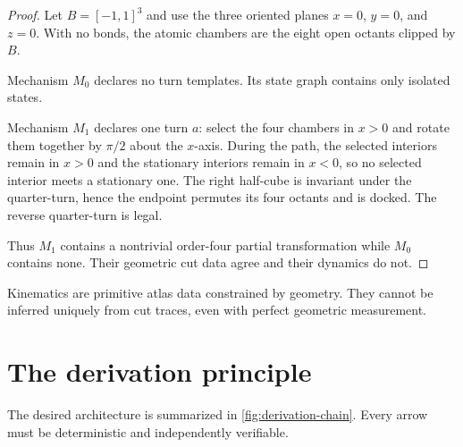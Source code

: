\documentclass[11pt,openany]{book}
\theoremstyle{polyplain}
\theoremstyle{polydef}
\begin{document}
\begin{proof}
Let $B=[-1,1]^3$ and use the three oriented planes $x=0$, $y=0$, and $z=0$. With no bonds, the atomic chambers are the eight open octants clipped by $B$.

Mechanism $M_0$ declares no turn templates. Its state graph contains only isolated states.

Mechanism $M_1$ declares one turn $a$: select the four chambers in $x>0$ and rotate them together by $\pi/2$ about the $x$-axis. During the path, the selected interiors remain in $x>0$ and the stationary interiors remain in $x<0$, so no selected interior meets a stationary one. The right half-cube is invariant under the quarter-turn, hence the endpoint permutes its four octants and is docked. The reverse quarter-turn is legal.

Thus $M_1$ contains a nontrivial order-four partial transformation while $M_0$ contains none. Their geometric cut data agree and their dynamics do not.
\end{proof}

\begin{designrule}
Kinematics are primitive atlas data constrained by geometry. They cannot be inferred uniquely from cut traces, even with perfect geometric measurement.
\end{designrule}

\section{The derivation principle}

The desired architecture is summarized in \cref{fig:derivation-chain}. Every arrow must be deterministic and independently verifiable.
\end{document}
